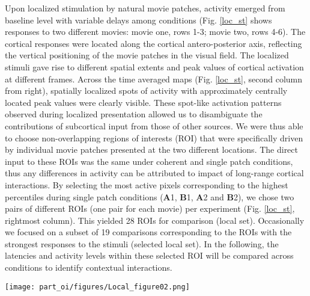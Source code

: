 Upon localized stimulation by natural movie patches, activity emerged from
baseline level with variable delays among conditions (Fig. \ref{loc_st}
shows responses to two different movies: movie one, rows 1-3; movie two,
rows 4-6). The cortical responses were located along the cortical
antero-posterior axis, reflecting the vertical positioning of the movie
patches in the visual field. The localized stimuli gave rise to different
spatial extents and peak values of cortical activation at different frames.
Across the time averaged maps (Fig. \ref{loc_st}, second column from
right), spatially localized spots of activity with approximately centrally
located peak values were clearly visible. These spot-like activation
patterns observed during localized presentation allowed us to disambiguate
the contributions of subcortical input from those of other sources. We were
thus able to choose non-overlapping regions of interests (ROI) that were
specifically driven by individual movie patches presented at the two
different locations. The direct input to these ROIs was  the same under
coherent and single patch conditions, thus any differences in activity can
be attributed to impact of long-range cortical interactions. By selecting
the most active pixels corresponding to the highest percentiles during
single patch conditions (\textbf{A}1, \textbf{B}1, \textbf{A}2 and \textbf{B}2), we chose two pairs of
different ROIs (one pair for each movie) per experiment (Fig. \ref{loc_st},
rightmost column). This yielded 28 ROIs for comparison (local set).
Occasionally we focused on a subset of 19 comparisons corresponding to the
ROIs with the strongest responses to the stimuli (selected local set). In
the following, the latencies and activity levels within these selected ROI
will be compared across conditions to identify contextual interactions.

\begin{sidewaysfigure}[!hp] 
\centerline{
\texttt{[image: part\_oi/figures/Local\_figure02.png]}}
\caption[Impact of Coherent Context on Cortical Activation Patterns.]
{\protect} 
\label{loc_st}
\end{sidewaysfigure} 


